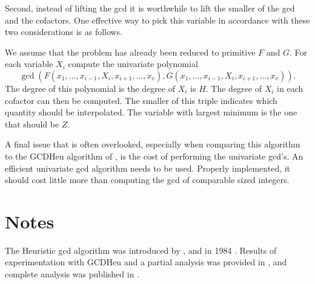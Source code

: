 Second, instead of lifting the {\sc gcd} it is worthwhile to lift the
smaller of the {\sc gcd} and the cofactors.  One effective way to pick
this variable in accordance with these two considerations is as
follows.

We assume that the problem has already been reduced to primitive $F$
and $G$.  For each variable $X_i$ compute the univariate polynomial
\[
\gcd(F(x_1, \ldots, x_{i-1}, X_i, x_{i+1}, \ldots, x_v), 
     G(x_1, \ldots, x_{i-1}, X_i, x_{i+1}, \ldots, x_v)).
\]
The degree of this polynomial is the degree of $X_i$ is $H$.  The
degree of $X_i$ in each cofactor can then be computed.  The smaller of
this triple indicates which quantity should be interpolated.  The
variable with largest minimum is the one that should be $Z$.

A final issue that is often overlooked, especially when comparing
this algorithm to the GCDHeu algorithm of
, is the cost of performing the univariate
{\sc gcd}'s.  An efficient univariate {\sc gcd} algorithm needs to be
used.  Properly implemented, it should cost little more than computing
the {\sc gcd} of comparable sized integers.

\section*{Notes}

\small

 The Heuristic {\sc gcd} algorithm was
introduced by {\CharBW}, {\Geddes} and {\Gonnet} in 1984 \cite{Char1984-tj}.
Results of experimentation with GCDHeu and a partial analysis was
provided in \cite{Davenport1985-rm}, and complete analysis was published
in \cite{Char1989-op}.

\normalsize


